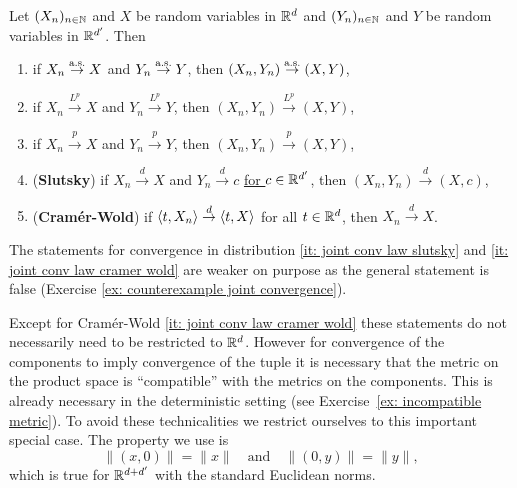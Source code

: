 \begin{mdframed}[innertopmargin=0pt]
\begin{theorem}
    \label{thm: joint convergence} Let \((X_n)_{n\in \mathbb{N}}\) and \(X\) be
    random variables in \(\mathbb{R}^d\) and  \((Y_n)_{n\in
    \mathbb{N}}\) and \(Y\) be random variables in \(\mathbb{R}^{d'}\). Then
    \begin{enumerate}[label=(\roman*)]
        \item \label{it: joint conv as}
        if \(X_n \overset{\operatorname{\text{a.s.}}}\to X\) and \(Y_n \overset{\operatorname{\text{a.s.}}}\to Y\),
        then \((X_n, Y_n) \overset{\operatorname{\text{a.s.}}}\to (X,Y)\),

        \item \label{it: joint conv Lp}
        if \(X_n \overset{L^p}\to X\) and \(Y_n \overset{L^p}\to Y\),
        then \((X_n, Y_n) \overset{L^p}\to (X,Y)\),

        \item \label{it: joint conv in prob}
        if \(X_n \overset{p}\to X\) and \(Y_n \overset{p}\to Y\),
        then \((X_n, Y_n) \overset{p}\to (X,Y)\),
        \item\label{it: joint conv law slutsky}
        (\textbf{Slutsky})
        if \(X_n \overset{d}\to X\) and \(Y_n \overset{d}\to c\) \underline{for \(c\in \mathbb{R}^{d'}\)},
        then \((X_n, Y_n) \overset{d}\to (X,c)\),

        \item\label{it: joint conv law cramer wold}
        (\textbf{Cramér-Wold})
        if \(\langle t, X_n\rangle \overset{d}\to \langle t,X\rangle\) for all \(t\in \mathbb{R}^d\),
        then \(X_n \overset{d}\to X\).
    \end{enumerate}
\end{theorem}
\end{mdframed}

The statements for convergence in distribution \ref{it: joint conv law slutsky}
and \ref{it: joint conv law cramer wold} are weaker on purpose as the general
statement is false (Exercise \ref{ex: counterexample
joint convergence}).

\begin{remark}[Generalization]
    Except for Cramér-Wold \ref{it: joint conv law cramer wold} these statements
    do not necessarily need to be restricted to \(\mathbb{R}^d\). However for
    convergence of the components to imply convergence of the tuple it is
    necessary that the metric on the product space is ``compatible'' with the
    metrics on the components. This is already necessary in the deterministic
    setting (see Exercise~\ref{ex: incompatible metric}). To avoid these
    technicalities we restrict ourselves to this important special case. The
    property we use is
    \[
        \|(x, 0)\| = \|x\|
        \quad\text{and}\quad
        \|(0,y)\| = \|y\|,
    \]
    which is true for \(\mathbb{R}^{d + d'}\) with the standard Euclidean norms.
\end{remark}

